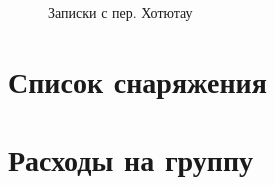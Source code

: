 \documentclass[a4paper, 12pt]{report}
\begin{document}
\begin{figure}[h!]
\begin{minipage}[h!]{0.325\linewidth}
	\end{minipage}
	\caption{Записки с пер. Хотютау}
	\label{pic:hotyutau}
\end{figure}

\section{Список снаряжения}
\section{Расходы на группу}



\end{document}
